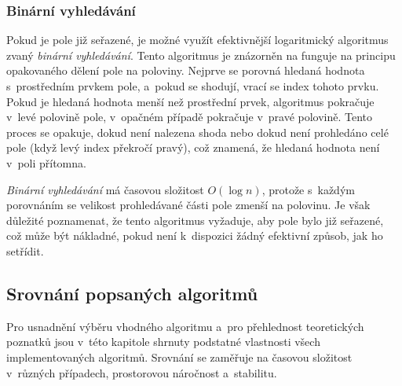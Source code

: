 \subsubsection*{Binární vyhledávání}

Pokud je pole již seřazené, je možné využít efektivnější logaritmický algoritmus zvaný \textit{binární vyhledávání}.
Tento algoritmus je znázorněn na  funguje na principu opakovaného dělení pole na poloviny.
Nejprve se porovná hledaná hodnota s~prostředním prvkem pole, a~pokud se shodují, vrací se index tohoto prvku.
Pokud je hledaná hodnota menší než prostřední prvek, algoritmus pokračuje v~levé polovině pole, v~opačném případě pokračuje v~pravé polovině.
Tento proces se opakuje, dokud není nalezena shoda nebo dokud není prohledáno celé pole (když levý index překročí pravý), což znamená, že hledaná hodnota není v~poli přítomna.

\begin{listing}[ht]
    
    \caption{Pseudokód binárního vyhledávání}
    \label{lst:binarySearch}
\end{listing}

\textit{Binární vyhledávání} má časovou složitost $O(\log n)$, protože s~každým porovnáním se velikost prohledávané části pole zmenší na polovinu.
Je však důležité poznamenat, že tento algoritmus vyžaduje, aby pole bylo již seřazené, což může být nákladné, pokud není k~dispozici žádný efektivní způsob, jak ho setřídit.~\cite{sedgewick}

\subsection{Srovnání popsaných algoritmů}
\label{subsec:sorting_comparison}

Pro usnadnění výběru vhodného algoritmu a~pro přehlednost teoretických poznatků jsou v~této kapitole shrnuty podstatné vlastnosti všech implementovaných algoritmů.
Srovnání se zaměřuje na časovou složitost v~různých případech, prostorovou náročnost a~stabilitu.

